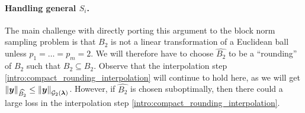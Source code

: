 \documentclass[11pt]{article}
\numberwithin{equation}{section}
\begin{document}
\paragraph{Handling general $S_i$.} The main challenge with directly porting this argument to the block norm sampling problem is that $B_2$ is not a linear transformation of a Euclidean ball unless $p_1=\dots=p_m=2$. We will therefore have to choose $\widehat{B_2}$ to be a ``rounding'' of $B_2$ such that $B_2 \subseteq \widehat{B_2}$. Observe that the interpolation step \eqref{intro:compact_rounding_interpolation} will continue to hold here, as we will get $\left\lVert \bm{y} \right\rVert_{\widehat{B_2}} \le \left\lVert \bm{y} \right\rVert_{\mathcal{G}_{2}(\bm{\lambda})}$. However, if $\widehat{B_2}$ is chosen suboptimally, then there could a large loss in the interpolation step \eqref{intro:compact_rounding_interpolation}.
\end{document}
